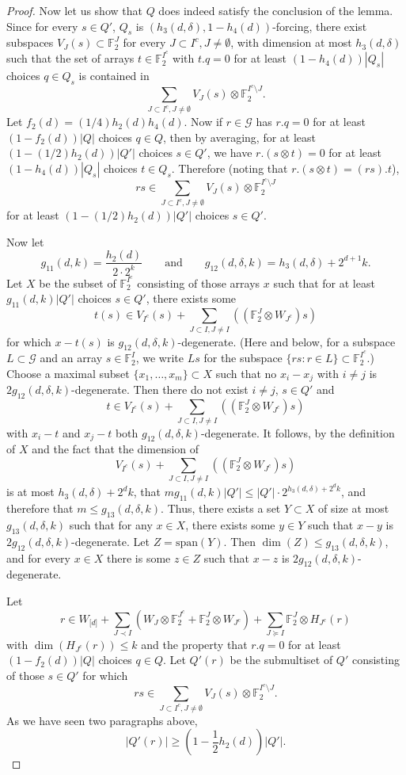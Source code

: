 \documentclass{toc}
\newcommand\F{\mathbb{F}}
\renewcommand\d{\delta}
\newcommand \cG{\mathcal G}
\newcommand \s{\subset}
\begin{document}
\begin{proof}
  Now let us show that $Q$ does indeed satisfy the conclusion of the
  lemma. Since for every $s\in Q'$, $Q_s$ is
  $(h_3(d,\d),1-h_4(d))$-forcing, there exist subspaces
  $V_J(s)\s \F_2^{J}$ for every $J\s I^c,J\neq \emptyset$, with
  dimension at most $h_3(d,\d)$ such that the set of arrays
  $t\in \F_2^{I^c}$ with $t.q=0$ for at least $(1-h_4(d))|Q_s|$
  choices $q\in Q_s$ is contained in
  \[
    \sum_{J\s I^c,J\neq \emptyset} V_J(s)\otimes \F_2^{I^c\setminus J}.
  \]
  Let $f_2(d)=({1}/{4}) h_2(d)h_4(d)$. Now if $r\in \cG$ has $r.q=0$
  for at least $(1-f_2(d))|Q|$ choices $q\in Q$, then by averaging,
  for at least $(1-({1}/{2})h_2(d))|Q'|$ choices $s\in Q'$, we have
  $r.(s\otimes t)=0$ for at least $(1-h_4(d))|Q_s|$ choices
  $t\in Q_s$. Therefore (noting that $r.(s\otimes t)=(rs).t$),
  \[
    rs\in \sum_{J\s I^c,J\neq \emptyset} V_J(s)\otimes
    \F_2^{I^c\setminus J}
  \]
  for at least $(1-({1}/{2})h_2(d))|Q'|$ choices $s\in Q'$.
	
  Now let
  \[
    g_{11}(d,k)=\frac{h_2(d)}{2\cdot 2^{k}}\qquad\text{and}\qquad
    g_{12}(d,\d,k)=h_3(d,\d)+2^{d+1}k.
  \]
  Let $X$ be the subset of $\F_2^{I^c}$ consisting of those arrays $x$
  such that for at least $g_{11}(d,k)|Q'|$ choices $s\in Q'$, there
  exists some
  \[
    t(s)\in V_{I^c}(s)+\sum_{J\subset I,J\neq I}((\F_2^{J}\otimes
    W_{J^c})s)
  \]
  for which $x-t(s)$ is $g_{12}(d,\d,k)$-degenerate. (Here and below,
  for a subspace $L\s \cG$ and an array $s\in \F_2^{I}$, we write $Ls$
  for the subspace $\{rs: r\in L\}\s \F_2^{I^c}$.) Choose a maximal
  subset $\{x_1,\dots,x_m\}\s X$ such that no $x_i-x_j$ with $i\neq j$
  is $2g_{12}(d,\d,k)$-degenerate. Then there do not exist $i\neq j$,
  $s\in Q'$ and
  \[
    t\in V_{I^c}(s)+\sum_{J\subset I,J\neq I} ((\F_2^{J}\otimes
    W_{J^c})s)
  \]
  with $x_i-t$ and $x_j-t$ both $g_{12}(d,\d,k)$-degenerate. It
  follows, by the definition of $X$ and the fact that the dimension of
  \[
    V_{I^c}(s)+\sum_{J\subset I,J\neq I} ((\F_2^{J}\otimes W_{J^c})s)
  \]
  is at most $h_3(d,\d)+2^dk$, that
  $mg_{11}(d,k)|Q'|\leq |Q'|\cdot 2^{h_3(d,\d)+2^dk}$, and therefore
  that $m\leq g_{13}(d,\d,k)$. Thus, there exists a set $Y\s X$ of
  size at most $g_{13}(d,\d,k)$ such that for any $x\in X$, there
  exists some $y\in Y$ such that $x-y$ is
  $2g_{12}(d,\d,k)$-degenerate. Let $Z=\text{span}(Y)$. Then
  $\dim(Z)\leq g_{13}(d,\d,k)$, and for every $x\in X$ there is some
  $z\in Z$ such that $x-z$ is $2g_{12}(d,\d,k)$-degenerate.

  Let
  \[r\in W_{\lbrack d\rbrack}+\sum_{J\prec I} (W_J\otimes
    \F_2^{J^c}+\F_2^{J}\otimes W_{J^c})+\sum_{J\succeq I}
    \F_2^{J}\otimes H_{J^c}(r)
  \]
  with $\dim(H_{J^c}(r))\leq k$ and the property that $r.q=0$ for at
  least $(1-f_2(d))|Q|$ choices $q\in Q$. Let $Q'(r)$ be the
  submultiset of $Q'$ consisting of those $s\in Q'$ for which
  \[
    rs\in \sum_{J\s I^c,J\neq \emptyset} V_J(s)\otimes
    \F_2^{I^c\setminus J}.
  \]
  As we have seen two paragraphs above,
  \[
    |Q'(r)|\geq \left(1-\frac{1}{2}h_2(d)\right)|Q'|.
  \]
	

\end{proof}
\end{document}
